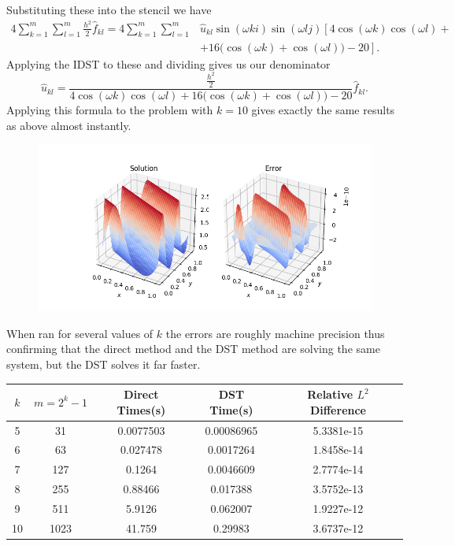 \documentclass[12pt]{article}
\begin{document}
Substituting these into the stencil we have
\begin{align*}
4\sum_{k=1}^m\sum_{l=1}^m \frac{h^2}{2} \hat{f}_{kl} = 4\sum_{k=1}^m\sum_{l=1}^m & \hat{u}_{kl} \sin(\omega ki)\sin(\omega lj) \left[ 4\cos(\omega k)\cos(\omega l) + \right. \\
				&+ \left. 16\big(\cos(\omega k)+\cos(\omega l)\big)- 20 \right].
\end{align*}
Applying the IDST to these and dividing gives us our denominator
$$
\hat{u}_{kl} = \frac{\frac{h^2}{2}}{4\cos(\omega k)\cos(\omega l) + 16\big(\cos(\omega k)+\cos(\omega l)\big) - 20} \hat{f}_{kl}.
$$
%
Applying this formula to the problem with $k=10$ gives exactly the same results as above almost instantly. 
\begin{figure}[H]
	\centering
	\includegraphics[width=1\linewidth]{hw4_p4_c}
\end{figure}

When ran for several values of $k$ the errors are roughly machine precision thus confirming that the direct method and the DST method are solving the same system, but the DST solves it far faster.
\begin{center}
	\begin{tabular}{|c|c|c|c|c|}
		\hline
		$k$&$m=2^k-1$&Direct Times(s)&DST Time(s)&Relative $L^2$ Difference\\ \hline
		5&31&0.0077503&0.00086965&5.3381e-15\\ \hline
		6&63&0.027478&0.0017264&1.8458e-14\\ \hline
		7&127&0.1264&0.0046609&2.7774e-14\\ \hline
		8&255&0.88466&0.017388&3.5752e-13\\ \hline
		9&511&5.9126&0.062007&1.9227e-12\\ \hline
		10&1023&41.759&0.29983&3.6737e-12\\ \hline
	\end{tabular}
\end{center}
\end{document}
